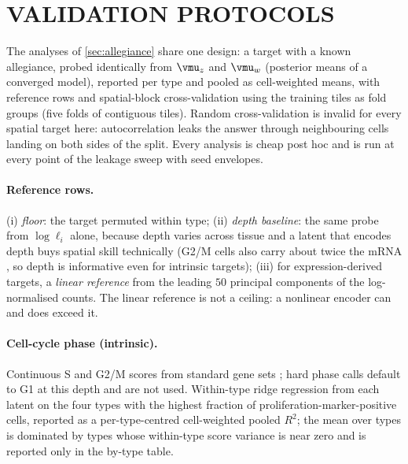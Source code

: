 \section{VALIDATION PROTOCOLS}
\label{app:validation}

The analyses of \cref{sec:allegiance} share one design: a target with a known allegiance, probed identically from $\vmu_z$ and $\vmu_w$ (posterior means of a converged model), reported per type and pooled as cell-weighted means, with reference rows and spatial-block cross-validation \citep{roberts2017} using the training tiles as fold groups (five folds of contiguous tiles). Random cross-validation is invalid for every spatial target here: autocorrelation leaks the answer through neighbouring cells landing on both sides of the split. Every analysis is cheap post hoc and is run at every point of the leakage sweep with seed envelopes.

\paragraph{Reference rows.} (i) \emph{floor}: the target permuted within type; (ii) \emph{depth baseline}: the same probe from $\log\ell_i$ alone, because depth varies across tissue and a latent that encodes depth buys spatial skill technically (G2/M cells also carry about twice the mRNA \needsource, so depth is informative even for intrinsic targets); (iii) for expression-derived targets, a \emph{linear reference} from the leading $50$ principal components of the log-normalised counts. The linear reference is not a ceiling: a nonlinear encoder can and does exceed it. 

\paragraph{Cell-cycle phase (intrinsic).} Continuous S and G2/M scores from standard gene sets \citep[$18$ S and $34$ G2/M markers on the panel; split-half reliability $0.22$ and $0.52$]{tirosh2016}; hard phase calls default to G1 at this depth and are not used. Within-type ridge regression from each latent on the four types with the highest fraction of proliferation-marker-positive cells, reported as a per-type-centred cell-weighted pooled $R^2$; the mean over types is dominated by types whose within-type score variance is near zero and is reported only in the by-type table. 

